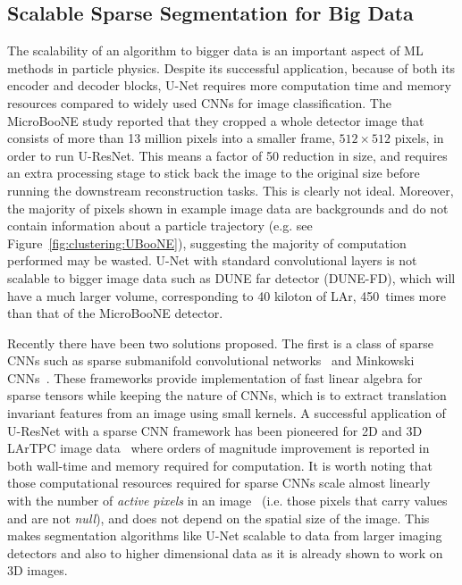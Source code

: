 \documentclass{ws-rv9x6}
\begin{document}
\subsection{Scalable Sparse Segmentation for Big Data}
The scalability of an algorithm to bigger data is an important aspect of ML methods in particle physics. Despite its successful application, because of both its encoder and decoder blocks, U-Net requires more computation time and memory resources compared to widely used CNNs for image classification. The MicroBooNE study reported that they cropped a whole detector image that consists of more than 13 million pixels into a smaller frame, $512\times512$ pixels, in order to run U-ResNet. This means a factor of 50 reduction in size, and requires an extra processing stage to stick back the image to the original size before running the downstream reconstruction tasks. This is clearly not ideal. Moreover, the majority of pixels shown in example image data are backgrounds and do not contain information about a particle trajectory (e.g. see Figure~\ref{fig:clustering:UBooNE}), suggesting the majority of computation performed may be wasted. U-Net with standard convolutional layers is not scalable to bigger image data such as DUNE far detector (DUNE-FD), which will have a much larger volume, corresponding to 40 kiloton of LAr, 450~times more than that of the MicroBooNE detector.

Recently there have been two solutions proposed. The first is a class of sparse CNNs such as sparse submanifold convolutional networks~\cite{SSCN1,SSCN2} and Minkowski CNNs~\cite{choy20194d}. These frameworks provide implementation of fast linear algebra for sparse tensors while keeping the nature of CNNs, which is to extract translation invariant features from an image using small kernels. A successful application of U-ResNet with a sparse CNN framework has been pioneered for 2D and 3D LArTPC image data~\cite{PhysRevD.102.012005} where orders of magnitude improvement is reported in both wall-time and memory required for computation. It is worth noting that those computational resources required for sparse CNNs scale almost linearly with the number of {\it active pixels} in an image~\cite{PhysRevD.102.012005} (i.e. those pixels that carry values and are not {\it null}), and does not depend on the spatial size of the image. This makes segmentation algorithms like U-Net scalable to data from larger imaging detectors and also to higher dimensional data as it is already shown to work on 3D images.
\end{document}
